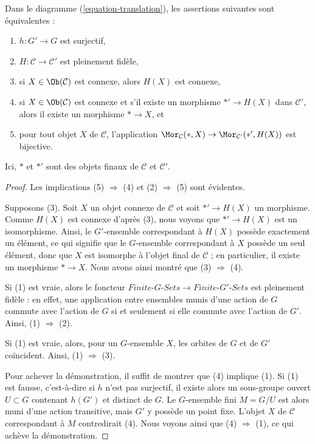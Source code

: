 \begin{lemma}
\label{lemma-functoriality-galois-surjective}
Dans le diagramme (\ref{equation-translation}), les assertions suivantes sont équivalentes :
\begin{enumerate}
\item $h : G' \to G$ est surjectif,
\item $H : \mathcal{C} \to \mathcal{C}'$ est pleinement fidèle,
\item si $X \in \Ob(\mathcal{C})$ est connexe, alors $H(X)$ est connexe,
\item si $X \in \Ob(\mathcal{C})$ est connexe et s'il existe
un morphisme $*' \to H(X)$ dans $\mathcal{C}'$, alors
il existe un morphisme $* \to X$, et
\item pour tout objet $X$ de $\mathcal{C}$, l'application
$\Mor_\mathcal{C}(*, X) \to \Mor_{\mathcal{C}'}(*', H(X))$
est bijective.
\end{enumerate}
Ici, $*$ et $*'$ sont des objets finaux de $\mathcal{C}$ et $\mathcal{C}'$.
\end{lemma}

\begin{proof}
Les implications (5) $\Rightarrow$ (4) et (2) $\Rightarrow$ (5) sont évidentes.

\medskip\noindent
Supposons (3). Soit $X$ un objet connexe de $\mathcal{C}$ et soit
$*' \to H(X)$ un morphisme. Comme $H(X)$ est connexe d'après (3),
nous voyons que $*' \to H(X)$ est un isomorphisme. Ainsi, le $G'$-ensemble
correspondant à $H(X)$ possède exactement un élément, ce qui signifie que le
$G$-ensemble correspondant à $X$ possède un seul élément, donc que $X$ est
isomorphe à l'objet final de $\mathcal{C}$ ; en particulier,
il existe un morphisme $* \to X$. Nous avons ainsi montré que (3) $\Rightarrow$ (4).

\medskip\noindent
Si (1) est vraie, alors le foncteur
$\textit{Finite-}G\textit{-Sets} \to \textit{Finite-}G'\textit{-Sets}$
est pleinement fidèle : en effet, une application entre ensembles munis d'une action de $G$ commute avec
l'action de $G$ si et seulement si elle commute avec l'action de $G'$.
Ainsi, (1) $\Rightarrow$ (2).

\medskip\noindent
Si (1) est vraie, alors, pour un $G$-ensemble $X$, les orbites de $G$ et de $G'$
coïncident. Ainsi, (1) $\Rightarrow$ (3).

\medskip\noindent
Pour achever la démonstration, il suffit de montrer que (4) implique (1).
Si (1) est fausse, c'est-à-dire si $h$ n'est pas surjectif, il existe alors
un sous-groupe ouvert $U \subset G$ contenant $h(G')$ et distinct
de $G$. Le $G$-ensemble fini $M = G/U$ est alors muni d'une action transitive,
mais $G'$ y possède un point fixe. L'objet $X$ de $\mathcal{C}$
correspondant à $M$ contredirait (4). Nous voyons ainsi que
(4) $\Rightarrow$ (1), ce qui achève la démonstration.
\end{proof}

